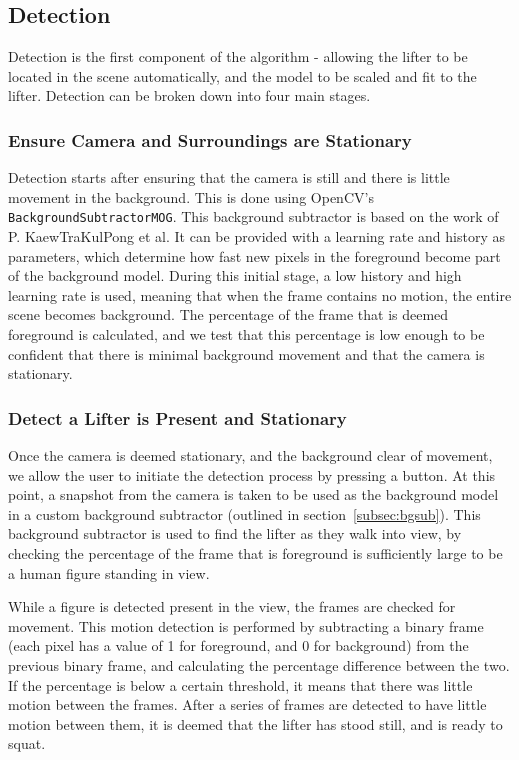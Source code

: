 \subsection{Detection}

Detection is the first component of the algorithm - allowing the lifter to be located in the scene automatically, and the model to be scaled and fit to the lifter. Detection can be broken down into four main stages.

\subsubsection{Ensure Camera and Surroundings are Stationary}
Detection starts after ensuring that the camera is still and there is little movement in the background. This is done using OpenCV's \texttt{BackgroundSubtractorMOG}. This background subtractor is based on the work of P. KaewTraKulPong et al\cite{backgroundsubmog}. It can be provided with a learning rate and history as parameters, which determine how fast new pixels in the foreground become part of the background model. During this initial stage, a low history and high learning rate is used, meaning that when the frame contains no motion, the entire scene becomes background. The percentage of the frame that is deemed foreground is calculated, and we test that this percentage is low enough to be confident that there is minimal background movement and that the camera is stationary.

\subsubsection{Detect a Lifter is Present and Stationary}
Once the camera is deemed stationary, and the background clear of movement, we allow the user to initiate the detection process by pressing a button. At this point, a snapshot from the camera is taken to be used as the background model in a custom background subtractor (outlined in section~\ref{subsec:bgsub}). This background subtractor is used to find the lifter as they walk into view, by checking the percentage of the frame that is foreground is sufficiently large to be a human figure standing in view. 

While a figure is detected present in the view, the frames are checked for movement. This motion detection is performed by subtracting a binary frame (each pixel has a value of 1 for foreground, and 0 for background) from the previous binary frame, and calculating the percentage difference between the two. If the percentage is below a certain threshold, it means that there was little motion between the frames. After a series of frames are detected to have little motion between them, it is deemed that the lifter has stood still, and is ready to squat.

